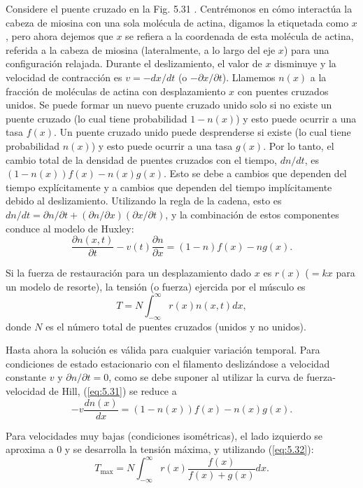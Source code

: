 \documentclass[12pt]{book}
\begin{document}
Considere el puente cruzado en la Fig. 5.31 \cite{41}. Centrémonos en cómo interactúa la cabeza de miosina con una sola molécula de actina, digamos la etiquetada como $x$, pero ahora dejemos que $x$ se refiera a la coordenada de esta molécula de actina, referida a la cabeza de miosina (lateralmente, a lo largo del eje $x$) para una configuración relajada. Durante el deslizamiento, el valor de $x$ disminuye y la velocidad de contracción es $v = -dx/dt$ (o $-\partial x/\partial t$). Llamemos $n(x)$ a la fracción de moléculas de actina con desplazamiento $x$ con puentes cruzados unidos. Se puede formar un nuevo puente cruzado unido solo si no existe un puente cruzado (lo cual tiene probabilidad $1 - n(x)$) y esto puede ocurrir a una tasa $f(x)$. Un puente cruzado unido puede desprenderse si existe (lo cual tiene probabilidad $n(x)$) y esto puede ocurrir a una tasa $g(x)$. Por lo tanto, el cambio total de la densidad de puentes cruzados con el tiempo, $dn/dt$, es $(1 - n(x)) f(x) - n(x) g(x)$. Esto se debe a cambios que dependen del tiempo explícitamente y a cambios que dependen del tiempo implícitamente debido al deslizamiento. Utilizando la regla de la cadena, esto es $dn/dt = \partial n/\partial t + (\partial n/\partial x)(\partial x/\partial t)$, y la combinación de estos componentes conduce al modelo de Huxley:
\begin{equation}
\frac{\partial n(x, t)}{\partial t} - v(t) \frac{\partial n}{\partial x} = (1 - n) f(x) - n g(x).
\label{eq:5.31}
\end{equation}

Si la fuerza de restauración para un desplazamiento dado $x$ es $r(x)$ ($= kx$ para un modelo de resorte), la tensión (o fuerza) ejercida por el músculo es
\begin{equation}
T = N \int_{-\infty}^{\infty} r(x) n(x, t) dx,
\label{eq:5.32}
\end{equation}
donde $N$ es el número total de puentes cruzados (unidos y no unidos).

Hasta ahora la solución es válida para cualquier variación temporal. Para condiciones de estado estacionario con el filamento deslizándose a velocidad constante $v$ y $\partial n/\partial t = 0$, como se debe suponer al utilizar la curva de fuerza-velocidad de Hill, (\ref{eq:5.31}) se reduce a
\begin{equation}
-v \frac{dn(x)}{dx} = (1 - n(x)) f(x) - n(x) g(x).
\label{eq:5.33}
\end{equation}

Para velocidades muy bajas (condiciones isométricas), el lado izquierdo se aproxima a $0$ y se desarrolla la tensión máxima, y utilizando (\ref{eq:5.32}):
\begin{equation}
T_{\text{max}} = N \int_{-\infty}^{\infty} r(x) \frac{f(x)}{f(x) + g(x)} dx.
\label{eq:5.34}
\end{equation}
\end{document}

